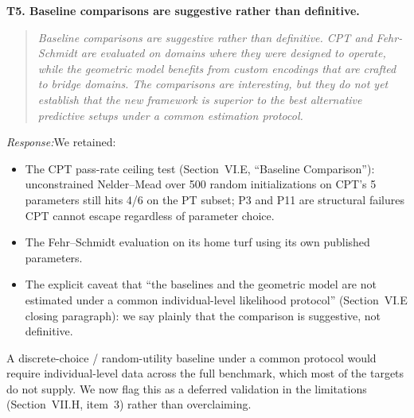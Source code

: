 \documentclass[11pt]{article}
\newcommand{\rev}[1]{\textbf{#1}}
\newcommand{\resp}{\medskip\noindent\emph{Response:}\quad}
\begin{document}
\rev{T5. Baseline comparisons are suggestive rather than definitive.}
\begin{quote}\itshape\small
Baseline comparisons are suggestive rather than definitive. CPT and Fehr-Schmidt are evaluated on domains where they were designed to operate, while the geometric model benefits from custom encodings that are crafted to bridge domains. The comparisons are interesting, but they do not yet establish that the new framework is superior to the best alternative predictive setups under a common estimation protocol.
\end{quote}
\resp We retained:
\begin{itemize}[leftmargin=*]
  \item The CPT pass-rate ceiling test (Section~VI.E, ``Baseline Comparison''):
        unconstrained Nelder--Mead over 500 random initializations on CPT's 5 parameters
        still hits 4/6 on the PT subset; P3 and P11 are structural failures CPT cannot
        escape regardless of parameter choice.
  \item The Fehr--Schmidt evaluation on its home turf using its own published parameters.
  \item The explicit caveat that ``the baselines and the geometric model are not estimated
        under a common individual-level likelihood protocol'' (Section~VI.E closing
        paragraph): we say plainly that the comparison is suggestive, not definitive.
\end{itemize}
A discrete-choice / random-utility baseline under a common protocol would require
individual-level data across the full benchmark, which most of the targets do not supply.
We now flag this as a deferred validation in the limitations (Section~VII.H, item~3) rather
than overclaiming.
\end{document}
